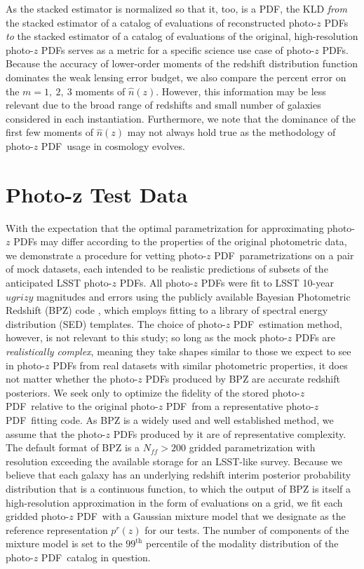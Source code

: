 \documentclass[\docopts]{\docclass}
\newcommand{\pz}{photo-$z$ PDF}
\begin{document}
As the stacked estimator is normalized so that it, too, is a PDF, the KLD 
\textit{from} the stacked estimator of a catalog of evaluations of 
reconstructed \pz s \textit{to} the stacked estimator of a catalog of 
evaluations of the original, high-resolution \pz s serves as a metric for a 
specific science use case of \pz s.
Because the accuracy of lower-order moments of the redshift distribution 
function dominates the weak lensing error budget, we also compare the percent 
error on the $m=1,\ 2,\ 3$ moments of $\hat{n}(z)$.
However, this information may be less relevant due to the broad range of 
redshifts and small number of galaxies considered in each instantiation.
Furthermore, we note that the dominance of the first few moments of 
$\hat{n}(z)$ may not always hold true as the methodology of \pz\ usage in 
cosmology evolves.


\section{Photo-z Test Data}
\label{sec:data}

With the expectation that the optimal parametrization for approximating \pz s 
may differ according to the properties of the original photometric data, we 
demonstrate a procedure for vetting \pz\ parametrizations on a pair of mock 
datasets, each intended to be realistic predictions of subsets of the 
anticipated LSST \pz s.
All \pz s were fit to LSST 10-year $ugrizy$ magnitudes and errors 
\citep{ivezic_lsst:_2008} using the publicly available Bayesian Photometric 
Redshift (BPZ) code \citep{benitez_bayesian_2000}, which employs fitting to a 
library of spectral energy distribution (SED) templates.
The choice of \pz\ estimation method, however, is not relevant to this study; 
so long as the mock \pz s are \textit{realistically complex}, meaning they take 
shapes similar to those we expect to see in \pz s from real datasets with 
similar photometric properties, it does not matter whether the \pz s produced 
by BPZ are accurate redshift posteriors.
We seek only to optimize the fidelity of the stored \pz\ relative to the 
original \pz\ from a representative \pz\ fitting code.
\citep[See][Schmidt, et al.\ in preparation for other work comparing the 
accuracy of \pz s produced by different methods.]{tanaka_photometric_2017, 
jong_third_2017, amaro_metaphor:_2016}
As BPZ is a widely used and well established method, we assume that the \pz s 
produced by it are of representative complexity.
The default format of BPZ is a $N_{ff}>200$ gridded parametrization with 
resolution exceeding the available storage for an LSST-like survey.
Because we believe that each galaxy has an underlying redshift interim 
posterior probability distribution that is a continuous function, to which the 
output of BPZ is itself a high-resolution approximation in the form of 
evaluations on a grid, we fit each gridded \pz\ with a Gaussian mixture model 
that we designate as the reference representation $p^{r}(z)$ for our tests.
The number of components of the mixture model is set to the $99^{\mathrm{th}}$ 
percentile of the modality distribution of the \pz\ catalog in question.
\end{document}
